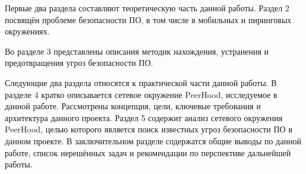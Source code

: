 \Sentence
Первые два раздела составляют теоретическую часть данной работы.
\Sentence
Раздел 2 посвящён проблеме безопасности ПО, в том числе в мобильных и пиринговых окружениях.
\begin{comment}
- понятие безопасности ПО
- истоки проблемы безопасности ПО
- дефекты безопасности ПО
- угрозы безопасности ПО
- атаки на ПО
- уязвимости ПО
- угрозы безопасности ПО в мобильном окружении
- угрозы безопасности ПО в пиринговом окружении
\end{comment}
%
\Sentence
Во разделе 3 представлены описания методик нахождения, устранения и предотвращения угроз 
безопасности ПО.
\begin{comment}
- обеспечение безопасности ПО
- понятие безопасного ПО
- тестирование ПО на безопасность
- тестирование по методу белого ящика
- тестирование по методу серого ящика
- тестирование по методу чёрного ящика
\end{comment}
%
\Sentence
Следующие два раздела относятся к практической части данной работы.
\Sentence
В разделе 4 кратко описывается сетевое окружение PeerHood, исследуемое в данной работе. 
\Sentence
Рассмотрены концепция, цели, ключевые требования и архитектура данного проекта.
\Sentence
Раздел 5 содержит анализ сетевого окружения PeerHood, целью которого является поиск известных 
угроз безопасности ПО в данном проекте.
%
\Sentence
В заключительном разделе содержатся общие выводы по данной работе, список нерешённых задач и 
рекомендации по перспективе дальнейшей работы.
%
\begin{comment}
Глаголы, которые можно использовать для того, чтобы описать, что содержится в разделах диссертации:
- рассматривает - considers
- отражает компоненты - represents
- рассматривается - to be considered, studies
- описывает - describes
- включает - includes
- предназначен для - to be intended for 
- даётся - deals with
- знакомит - introduces
- на чём будет сфокусирован - will focus on
- начинается и заканчивается - begins and concludes
- обрисовывает - outlines
- содержит - to be comprised of
- объясняет - explains
- состоит из подразделов - is consist of
- посвящён - dedicates to
- подводит итог - summarizes
- исследуется - to be studied
\end{comment}
